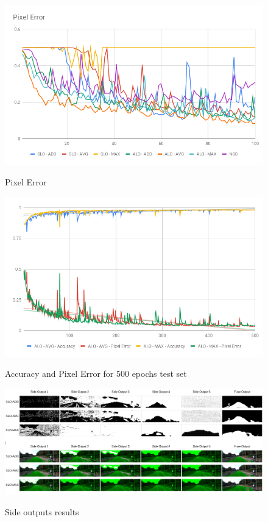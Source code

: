 \begin{figure}
  \caption{Pixel Error}
  \centering
  \includegraphics[width=1.\columnwidth]{figures/falreis/pixel_error.png}\label{fig:pixel_error}
\end{figure}

\begin{figure}
  \caption{Accuracy and Pixel Error for 500 epochs test set}
  \centering
  \includegraphics[width=1.\columnwidth]{figures/falreis/val_acc_500_epochs.png}\label{fig:val_acc_500_epochs}
\end{figure}

\begin{figure}
  \caption{Side outputs results}
  \centering
  \includegraphics[width=1.\textwidth]{figures/falreis/side_outputs.png}\label{fig:side_outputs}
\end{figure}




